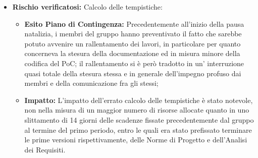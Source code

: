 \begin{itemize}
\item \textbf{Rischio verificatosi:} Calcolo delle tempistiche:
\begin{itemize}
    \item \textbf{Esito Piano di Contingenza:} Precedentemente all'inizio della pausa natalizia, i membri del gruppo hanno preventivato il fatto che sarebbe potuto avvenire un rallentamento dei lavori, in particolare per quanto concerneva la stesura della documentazione ed in misura minore della codifica del PoC; il rallentamento si è però tradotto in un' interruzione quasi totale della stesura stessa e in generale dell'impegno profuso dai membri e della comunicazione fra gli stessi;
    \item \textbf{Impatto:} L'impatto dell'errato calcolo delle tempistiche è stato notevole, non nella misura di un maggior numero di risorse allocate quanto in uno slittamento di 14 giorni delle scadenze fissate precedentemente dal gruppo al termine del primo periodo, entro le quali era stato prefissato terminare le prime versioni rispettivamente, delle Norme di Progetto e dell'Analisi dei Requisiti.
\end{itemize}
\end{itemize}

